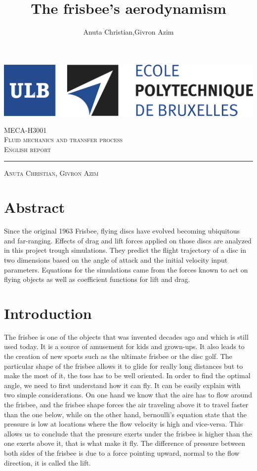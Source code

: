 \documentclass[10pt,a4paper]{report}
\author{Anuta Christian,Givron Azim}
\title{The frisbee's aerodynamism}
\begin{document}
\begin{titlepage}

\includegraphics[scale=0.5]{logo-polytech-ULB-FR.jpg}

\center 
\vspace{5cm}
\textsc{\large MECA-H3001} \\[0.5cm]
\textsc{\LARGE Fluid mechanics and transfer process} \\[1.5cm]
\textsc{\Large English report} %

\rule{\textwidth}{1pt}

\vspace{2cm}

\textsc{\large Anuta Christian, Givron Azim}

\end{titlepage}

\tableofcontents
\newpage 
\listoffigures
\newpage
\section{Abstract}
Since the original 1963 Frisbee, flying discs have evolved becoming ubiquitous and far-ranging. Effects of drag and lift forces applied on those discs are analyzed in this project trough simulations. They predict the flight trajectory of a disc in two dimensions based on the angle of attack and the initial velocity input parameters. Equations for the simulations came from the forces known to act on flying objects as well as coefficient functions for lift and drag.
\section{Introduction}
The frisbee is one of the objects that was invented decades ago and which is still used today. It is a source of amusement for kids and grown-ups. It also leads to the creation of new sports such as the ultimate frisbee or the disc golf. The particular shape of the frisbee allows it to glide for really long distances but to make the most of it, the toss has to be well oriented. In order to find the optimal angle, we need to first understand how it can fly. It can be easily explain with two simple considerations. On one hand we know that the aire has to flow around the frisbee, and the frisbee shape forces the air traveling above it to travel faster than the one below, while on the other hand, bernoulli's equation state that the pressure is low at locations where the flow velocity is high and vice-versa. This allows us to conclude that the pressure exerts under the frisbee is higher than the one exerts above it, that is what make it fly. The difference of pressure between both sides of the frisbee is due to a force pointing upward, normal to the flow direction, it is called the lift. 
\end{document}
